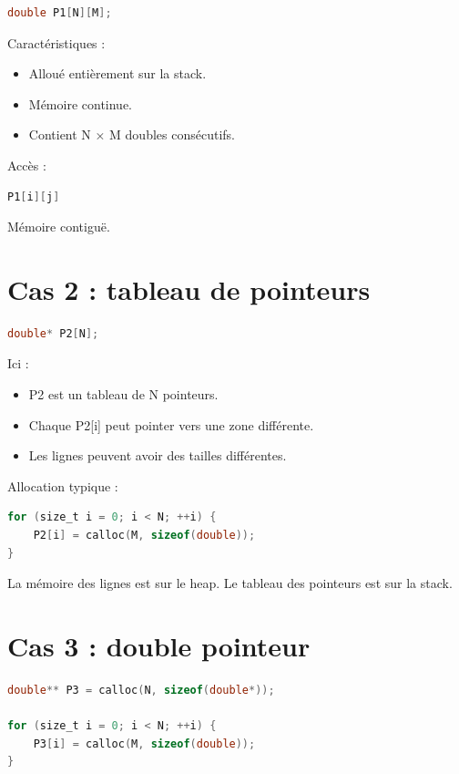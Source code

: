 \begin{lstlisting}[language=C]
double P1[N][M];
\end{lstlisting}

Caractéristiques :

\begin{itemize}
\item Alloué entièrement sur la stack.
\item Mémoire continue.
\item Contient N × M doubles consécutifs.
\end{itemize}

Accès :

\begin{lstlisting}[language=C]
P1[i][j]
\end{lstlisting}

Mémoire contiguë.

\section{Cas 2 : tableau de pointeurs}

\begin{lstlisting}[language=C]
double* P2[N];
\end{lstlisting}

Ici :

\begin{itemize}
\item P2 est un tableau de N pointeurs.
\item Chaque P2[i] peut pointer vers une zone différente.
\item Les lignes peuvent avoir des tailles différentes.
\end{itemize}

Allocation typique :

\begin{lstlisting}[language=C]
for (size_t i = 0; i < N; ++i) {
    P2[i] = calloc(M, sizeof(double));
}
\end{lstlisting}

La mémoire des lignes est sur le heap.
Le tableau des pointeurs est sur la stack.

\section{Cas 3 : double pointeur}

\begin{lstlisting}[language=C]
double** P3 = calloc(N, sizeof(double*));

for (size_t i = 0; i < N; ++i) {
    P3[i] = calloc(M, sizeof(double));
}
\end{lstlisting}

